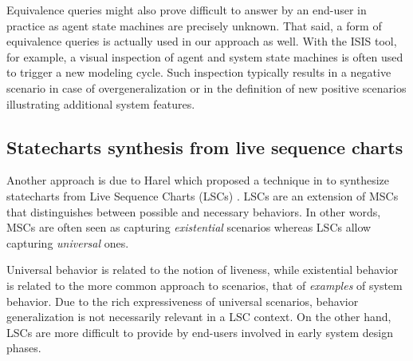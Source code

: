 Equivalence queries might also prove difficult to answer by an end-user in practice as agent state machines are precisely unknown. That said, a form of equivalence queries is actually used in our approach as well. With the ISIS tool, for example, a visual inspection of agent and system state machines is often used to trigger a new modeling cycle. Such inspection typically results in a negative scenario in case of overgeneralization or in the definition of new positive scenarios illustrating additional system features. 


\subsection{Statecharts synthesis from live sequence charts}

Another approach is due to Harel which proposed a technique in \cite{Harel:2005} to synthesize statecharts from Live Sequence Charts (LSCs) \cite{Damm:2001}. LSCs are an extension of MSCs that distinguishes between possible and necessary behaviors. In other words, MSCs are often seen as capturing \emph{existential} scenarios whereas LSCs allow capturing \emph{universal} ones. 

Universal behavior is related to the notion of liveness, while existential behavior is related to the more common approach to scenarios, that of \emph{examples} of system behavior. Due to the rich expressiveness of universal scenarios, behavior generalization is not necessarily relevant in a LSC context. On the other hand, LSCs are more difficult to provide by end-users involved in early system design phases. 

